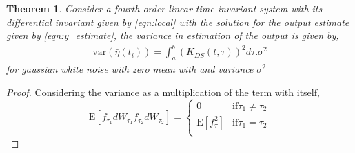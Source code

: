 \documentclass[letterpaper%
, twoside%
, 12pt%
,memoire%
, english%
,creativecommons,hyperref%
]{thETS}
\newtheorem{theorem}{Theorem}
\begin{document}
\begin{theorem}
Consider a fourth order linear time invariant system with its differential invariant given by \eqref{eqn:local} with the solution for the output estimate given by \eqref{eqn:y_estimate}, the variance in estimation of the output is given by, 
\begin{align*}
\text{var}(\bar{\eta}(t_i)) = \int_a^b \left(K_{DS}(t,\tau)\right)^2 d\tau . \sigma^2
\end{align*}
for gaussian white noise with zero mean with and variance $\sigma^2$
\end{theorem}
\begin{proof}
Considering the variance as a multiplication of the term with itself, 
\[ \text{E}[f_{\tau_1}dW_{\tau_1} f_{\tau_2}dW_{\tau_2}] = 
   \begin{cases} 
      0 & \text{if} \tau_1 \neq \tau_2  \\
      \text{E}[ f_\tau^2] & \text{if} \tau_1 = \tau_2 \\
       

\end{cases}\]
\end{proof}
\end{document}
